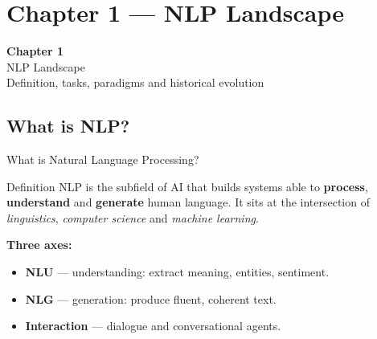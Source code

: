 \documentclass[11pt,aspectratio=169]{beamer}
\begin{document}
\section{Chapter 1 --- NLP Landscape}

\begin{frame}
\centering
\Large \textbf{Chapter 1}\\[1em]
\large NLP Landscape\\[1em]
\normalsize Definition, tasks, paradigms and historical evolution
\end{frame}

\subsection{What is NLP?}

\begin{frame}{What is Natural Language Processing?}
\begin{block}{Definition}
NLP is the subfield of AI that builds systems able to \textbf{process}, \textbf{understand} and \textbf{generate} human language. It sits at the intersection of \emph{linguistics}, \emph{computer science} and \emph{machine learning}.
\end{block}
\vfill
\textbf{Three axes:}
\begin{itemize}
    \item \textbf{NLU} --- understanding: extract meaning, entities, sentiment.
    \item \textbf{NLG} --- generation: produce fluent, coherent text.
    \item \textbf{Interaction} --- dialogue and conversational agents.
\end{itemize}
\end{frame}
\end{document}
